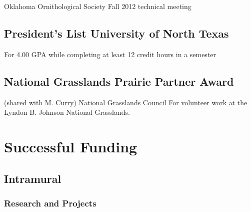 \documentclass[
  letterpaper,
  DIV=11,
  numbers=noendperiod,
  oneside]{scrreprt}
\begin{document}

Oklahoma Ornithological Society Fall 2012 technical meeting

\section{President's List University of North
Texas}\label{presidents-list-university-of-north-texas}


For 4.00 GPA while completing at least 12 credit hours in a semester

\section{National Grasslands Prairie Partner
Award}\label{national-grasslands-prairie-partner-award}


(shared with M. Curry) National Grasslands Council For volunteer work at
the Lyndon B. Johnson National Grasslands.


\chapter{Successful Funding}\label{successful-funding}

\section{Intramural}\label{intramural}

\subsection{Research and Projects}\label{research-and-projects}
\end{document}
